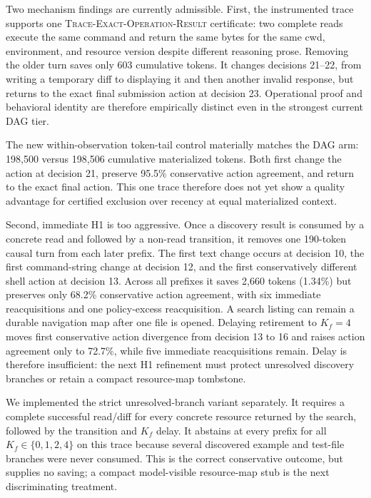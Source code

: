 \documentclass[11pt]{article}
\begin{document}
Two mechanism findings are currently admissible. First, the instrumented trace supports one
\textsc{Trace-Exact-Operation-Result} certificate: two complete reads execute
the same command and return the same bytes for the same cwd, environment, and
resource version despite different reasoning prose.  Removing the older turn
saves only 603 cumulative tokens.  It changes decisions 21--22, from writing a
temporary diff to displaying it and then another invalid response, but returns
to the exact final submission action at decision 23.  Operational proof and
behavioral identity are therefore empirically distinct even in the strongest
current DAG tier.

The new within-observation token-tail control materially matches the DAG arm:
198,500 versus 198,506 cumulative materialized tokens. Both first change the
action at decision 21, preserve 95.5\% conservative action agreement, and
return to the exact final action. This one trace therefore does not yet show a
quality advantage for certified exclusion over recency at equal materialized
context.

Second, immediate H1 is too aggressive. Once a discovery result is consumed by
a concrete read and followed by a non-read transition, it removes one
190-token causal turn from each later prefix. The first text change occurs at
decision 10, the first command-string change at decision 12, and the first
conservatively different shell action at decision 13. Across all prefixes it
saves 2,660 tokens (1.34\%) but preserves only 68.2\% conservative action
agreement, with six immediate reacquisitions and one policy-excess
reacquisition. A search listing can remain a durable navigation map after one
file is opened. Delaying retirement to $K_f=4$ moves first conservative action
divergence from decision 13 to 16 and raises action agreement only to 72.7\%,
while five immediate reacquisitions remain. Delay is therefore insufficient:
the next H1 refinement must protect unresolved discovery branches or retain a
compact resource-map tombstone.

We implemented the strict unresolved-branch variant separately. It requires a
complete successful read/diff for every concrete resource returned by the
search, followed by the transition and $K_f$ delay. It abstains at every prefix
for all $K_f\in\{0,1,2,4\}$ on this trace because several discovered example
and test-file branches were never consumed. This is the correct conservative
outcome, but supplies no saving; a compact model-visible resource-map stub is
the next discriminating treatment.
\end{document}
